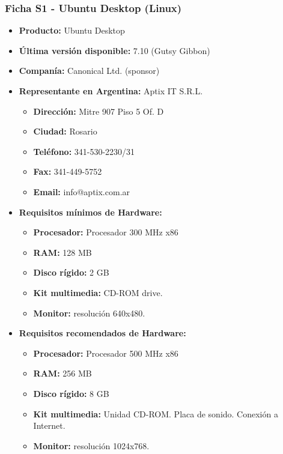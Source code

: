 \subsubsection{Ficha S1 - Ubuntu Desktop (Linux)}

\begin{itemize}
  \item \textbf{Producto:} Ubuntu Desktop
  \item \textbf{Última versión disponible:} 7.10 (Gutsy Gibbon)
  \item \textbf{Companía:} Canonical Ltd. (sponsor)

  \item \textbf{Representante en Argentina:} Aptix IT S.R.L.
    \begin{itemize}
      \item \textbf{Dirección:} Mitre 907 Piso 5 Of. D
      \item \textbf{Ciudad:} Rosario
      \item \textbf{Teléfono:} 341-530-2230/31
      \item \textbf{Fax:} 341-449-5752
      \item \textbf{Email:} info@aptix.com.ar
    \end{itemize}

  \item \textbf{Requisitos mínimos de Hardware:}
    \begin{itemize}
      \item \textbf{Procesador:} Procesador 300 MHz x86
      \item \textbf{RAM:} 128 MB
      \item \textbf{Disco rígido:} 2 GB
      \item \textbf{Kit multimedia:} CD-ROM drive.
      \item \textbf{Monitor:} resolución 640x480.
    \end{itemize}

  \item \textbf{Requisitos recomendados de Hardware:}
    \begin{itemize}
      \item \textbf{Procesador:} Procesador 500 MHz x86
      \item \textbf{RAM:} 256 MB
      \item \textbf{Disco rígido:} 8 GB
      \item \textbf{Kit multimedia:} Unidad CD-ROM. Placa de sonido. Conexión a Internet.
      \item \textbf{Monitor:} resolución 1024x768.
    \end{itemize}


\end{itemize}

